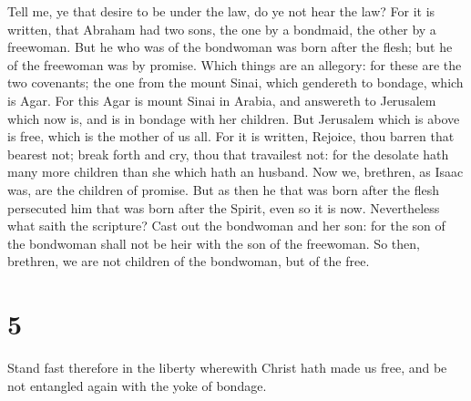  Tell me, ye that desire to be under the law, do ye not
hear the law?  For it is written, that Abraham had two
sons, the one by a bondmaid, the other by a freewoman.  But
he who was of the bondwoman was born after the flesh; but he of the
freewoman was by promise.  Which things are an allegory:
for these are the two covenants; the one from the mount Sinai, which
gendereth to bondage, which is Agar.  For this Agar is
mount Sinai in Arabia, and answereth to Jerusalem which now is, and is
in bondage with her children.  But Jerusalem which is above
is free, which is the mother of us all.  For it is written,
Rejoice, thou barren that bearest not; break forth and cry, thou that
travailest not: for the desolate hath many more children than she which
hath an husband.  Now we, brethren, as Isaac was, are the
children of promise.  But as then he that was born after
the flesh persecuted him that was born after the Spirit, even so it is
now.  Nevertheless what saith the scripture? Cast out the
bondwoman and her son: for the son of the bondwoman shall not be heir
with the son of the freewoman.  So then, brethren, we are
not children of the bondwoman, but of the free.

\hypertarget{section-4}{%
\section{5}\label{section-4}}

 Stand fast therefore in the liberty wherewith Christ hath
made us free, and be not entangled again with the yoke of bondage.

